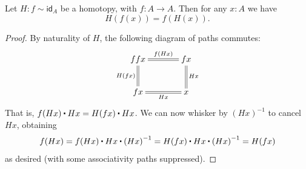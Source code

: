 \documentclass[10pt,a4paper]{article}
\newcommand{\ct}{%
  \mathchoice{\mathbin{\raisebox{0.5ex}{$\displaystyle\centerdot$}}}%
             {\mathbin{\raisebox{0.5ex}{$\centerdot$}}}%
             {\mathbin{\raisebox{0.25ex}{$\scriptstyle\,\centerdot\,$}}}%
             {\mathbin{\raisebox{0.1ex}{$\scriptscriptstyle\,\centerdot\,$}}}
}
\newcommand{\opp}[1]{\mathord{{#1}^{-1}}}
\newcommand{\map}[2]{\ensuremath{{#1}\mathopen{}\left({#2}\right)\mathclose{}}\xspace}
\let\ap\map
\newcommand{\idfunc}[1][]{\ensuremath{\mathsf{id}_{#1}}\xspace}
\newcommand{\htpy}{\sim}
\newcommand{\com}[3]{\mathsf{swap}_{#1,#2}(#3)}
\theoremstyle{definition}
\theoremstyle{remark}
\numberwithin{equation}{section}
\begin{document}
\begin{cor}\label{cor:hom-fg}
  Let $H : f \htpy \idfunc[A]$ be a homotopy, with $f : A \to A$. Then for any $x : A$ we have \[ H(f(x)) = \ap f{H(x)}. \]
\end{cor}

\begin{proof}
By naturality of $H$, the following diagram of paths commutes:
\begin{align*}
\xymatrix@C=3pc{
ffx \ar@{=}[r]^-{\ap f{Hx}} \ar@{=}[d]_{H(fx)} & fx \ar@{=}[d]^{Hx} \\
fx \ar@{=}[r]_-{Hx} & x
}
\end{align*}
That is, $\ap f{H x} \ct H x = H(f x) \ct H x$.
We can now whisker by $\opp{(H x)}$ to cancel $H x$, obtaining
\[ \ap f{H x}
= \ap f{H x} \ct H x \ct \opp{(H x)}
= H(f x) \ct H x \ct \opp{(H x)}
= H(f x)
\]
as desired (with some associativity paths suppressed).
\end{proof}
\end{document}
